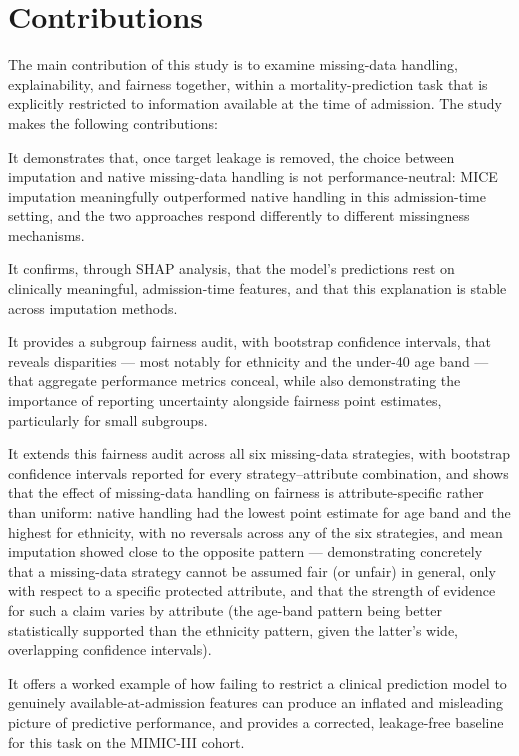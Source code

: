 \documentclass[12pt,a4paper]{report}
\begin{document}
\section{Contributions}
The main contribution of this study is to examine missing-data handling, explainability, and fairness together, within a mortality-prediction task that is explicitly restricted to information available at the time of admission. The study makes the following contributions:

It demonstrates that, once target leakage is removed, the choice between imputation and native missing-data handling is not performance-neutral: MICE imputation meaningfully outperformed native handling in this admission-time setting, and the two approaches respond differently to different missingness mechanisms.

It confirms, through SHAP analysis, that the model's predictions rest on clinically meaningful, admission-time features, and that this explanation is stable across imputation methods.

It provides a subgroup fairness audit, with bootstrap confidence intervals, that reveals disparities --- most notably for ethnicity and the under-40 age band --- that aggregate performance metrics conceal, while also demonstrating the importance of reporting uncertainty alongside fairness point estimates, particularly for small subgroups.

It extends this fairness audit across all six missing-data strategies, with bootstrap confidence intervals reported for every strategy--attribute combination, and shows that the effect of missing-data handling on fairness is attribute-specific rather than uniform: native handling had the lowest point estimate for age band and the highest for ethnicity, with no reversals across any of the six strategies, and mean imputation showed close to the opposite pattern --- demonstrating concretely that a missing-data strategy cannot be assumed fair (or unfair) in general, only with respect to a specific protected attribute, and that the strength of evidence for such a claim varies by attribute (the age-band pattern being better statistically supported than the ethnicity pattern, given the latter's wide, overlapping confidence intervals).

It offers a worked example of how failing to restrict a clinical prediction model to genuinely available-at-admission features can produce an inflated and misleading picture of predictive performance, and provides a corrected, leakage-free baseline for this task on the MIMIC-III cohort.
\end{document}
